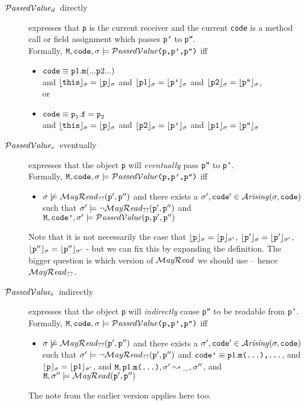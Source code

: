 \documentclass{llncs}
\newcommand{\prg}[1]{{\mbox{\tt{#1}}}}
\begin{document}
\begin{description}
\item[$\mathcal{P}\textrm{\textit{assed}}{\mathcal{V}}\textrm{\textit{alue}}_{d}$\ directly] expresses that \prg{p} is the current receiver and the current \prg{code} is a method call or field assignment which passes \prg{p'} to \prg{p''}.\\
Formally,
 $\Prog{},\prg{code},\sigma\models   \prg{\PassedValue(\p,\p',\p'')}$ iff
\begin{itemize}
\item $\prg{code}\equiv \prg{p}1.\prg{m}(... \prg{p}2... )$ \\
and 
 $\interp{\prg{this}}{\sigma}=\interp{\prg{p}}{\sigma}$ 
 and $\interp{\p1}{\sigma} =\interp{\prg{p'}}{\sigma}$
 and $\interp{\prg{p2}}{\sigma}=\interp{\prg{p''}}{\sigma}$,
 \\
 or
\item  $\prg{code}\equiv \prg{p}_1.\prg{f}=\prg{p}_2$ \\ and 
 $\interp{\prg{this}}{\sigma}=\interp{\prg{p}}{\sigma}$ 
 and $\interp{\prg{p2}}{\sigma} =\interp{\prg{p'}}{\sigma}$
 and $\interp{\prg{p1}}{\sigma}=\interp{\prg{p''}}{\sigma}$
\end{itemize}
\item[$\mathcal{P}\textrm{\textit{assed}}{\mathcal{V}}\textrm{\textit{alue}}_{e}$\ eventually] expresses that the object  \prg{p} will {\em eventually} pass \prg{p''} to \prg{p'}. 
\\
Formally,
$\Prog{},\prg{code},\sigma\models   \prg{\PassedValue(\p,\p',\p'')}$ iff
\begin{itemize}
\item $\sigma \not\models \MayRead_{??}(\p',\p'')$ and 
there exists a $\sigma',\prg{code}'\in \Arising(\sigma,\prg{code})$ such that
$\sigma' \models \neg  \MayRead_{??}(\p',\p'')$ and 
$\Prog{},\prg{code'},\sigma'\models  \PassedValue(\p,\p',\p'')  $
\end{itemize}
Note that it is not necessarily the case that $\interp{\p}{\sigma}=\interp{\p}{\sigma'}$, $\interp{\p'}{\sigma}=\interp{\p'}{\sigma'}$, 
$\interp{\p''}{\sigma}=\interp{\p''}{\sigma'}$ - but we can fix this by expanding the definition. The bigger question is which version of 
$\mathcal{M}\textrm{\textit{ay}}{\mathcal{R}}\textrm{\textit{ead}}$ we should use -- hence $\mathcal{M}\textrm{\textit{ay}}{\mathcal{R}}\textrm{\textit{ead}}_{??}$.

\item[$\mathcal{P}\textrm{\textit{assed}}{\mathcal{V}}\textrm{\textit{alue}}_{i}$\ indirectly] expresses that the object  \prg{p} will {\em indirectly} cause \prg{p''} to be readable from \prg{p'}. 
\\
Formally,
$\Prog{},\prg{code},\sigma\models   \prg{\PassedValue(\p,\p',\p'')}$ iff
\begin{itemize}
\item $\sigma \not\models \MayRead_{??}(\p',\p'')$ and 
there exists a $\sigma',\prg{code}'\in \Arising(\sigma,\prg{code})$ such that
$\sigma' \models \neg  \MayRead_{??}(\p',\p'')$ and 
$\prg{code'}\equiv \p1.\prg{m(...),...}$, and $\interp{\p}{\sigma}=\interp{\p1}{\sigma'}$,
and
$\Prog{},  \p1.\prg{m(...)},\sigma' \leadsto \_,\sigma''$,
and
$\Prog{},\sigma''\models  \MayRead(\p',\p'')  $
\end{itemize}
The note from the earlier version applies here too.

\end{description}
\end{document}
